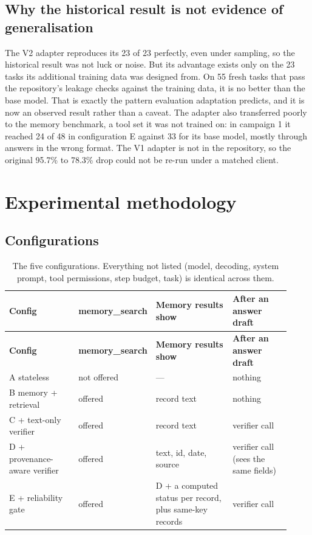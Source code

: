 \documentclass[10.5pt,a4paper,oneside]{report}
\begin{document}
\section{Why the historical result is not evidence of generalisation}
The V2 adapter reproduces its 23 of 23 perfectly, even under sampling, so the historical result was not luck or noise. But its advantage exists only on the 23 tasks its additional training data was designed from. On 55 fresh tasks that pass the repository's leakage checks against the training data, it is no better than the base model. That is exactly the pattern evaluation adaptation predicts, and it is now an observed result rather than a caveat. The adapter also transferred poorly to the memory benchmark, a tool set it was not trained on: in campaign 1 it reached 24 of 48 in configuration E against 33 for its base model, mostly through answers in the wrong format. The V1 adapter is not in the repository, so the original 95.7\% to 78.3\% drop could not be re-run under a matched client.

\clearpage
\chapter{Experimental methodology}
\section{Configurations}
\begingroup\small\setlength{\tabcolsep}{4pt}\renewcommand{\arraystretch}{1.18}
\begin{longtable}{>{\raggedright\arraybackslash}p{0.251\linewidth}>{\raggedright\arraybackslash}p{0.165\linewidth}>{\raggedright\arraybackslash}p{0.289\linewidth}>{\raggedright\arraybackslash}p{0.215\linewidth}}
\caption{The five configurations. Everything not listed (model, decoding, system prompt, tool permissions, step budget, task) is identical across them.}\\
\toprule
\textbf{Config} & \textbf{memory\_search} & \textbf{Memory results show} & \textbf{After an answer draft} \\
\midrule
\endfirsthead
\toprule
\textbf{Config} & \textbf{memory\_search} & \textbf{Memory results show} & \textbf{After an answer draft} \\
\midrule
\endhead
\bottomrule
\endlastfoot
A stateless & not offered & — & nothing \\
B memory + retrieval & offered & record text & nothing \\
C + text-only verifier & offered & record text & verifier call \\
D + provenance-aware verifier & offered & text, id, date, source & verifier call (sees the same fields) \\
E + reliability gate & offered & D + a computed status per record, plus same-key records & verifier call \\
\end{longtable}
\endgroup
\end{document}
